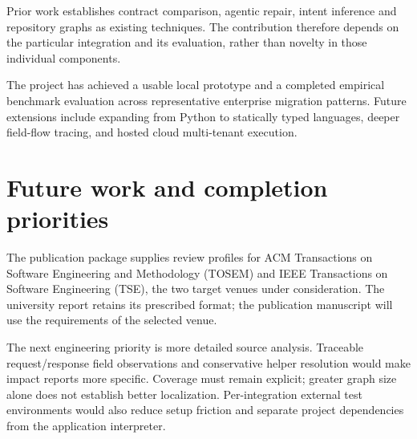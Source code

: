 \documentclass[12pt,a4paper,oneside]{report}
\begin{document}
Prior work establishes contract comparison, agentic repair, intent inference and repository graphs as existing techniques. The contribution therefore depends on the particular integration and its evaluation, rather than novelty in those individual components.

The project has achieved a usable local prototype and a completed empirical benchmark evaluation across representative enterprise migration patterns. Future extensions include expanding from Python to statically typed languages, deeper field-flow tracing, and hosted cloud multi-tenant execution.

\section{Future work and completion priorities}

The publication package supplies review profiles for ACM Transactions on Software Engineering and Methodology (TOSEM) and IEEE Transactions on Software Engineering (TSE), the two target venues under consideration. The university report retains its prescribed format; the publication manuscript will use the requirements of the selected venue.

The next engineering priority is more detailed source analysis. Traceable request/response field observations and conservative helper resolution would make impact reports more specific. Coverage must remain explicit; greater graph size alone does not establish better localization. Per-integration external test environments would also reduce setup friction and separate project dependencies from the application interpreter.
\end{document}
